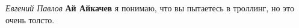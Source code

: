 \begin{itemize}
\begin{itemize}
\emph{Евгений Павлов}
\textbf{Ай Айкачев} я понимаю, что вы пытаетесь в троллинг, но это очень толсто.

\end{itemize}

\end{itemize}


